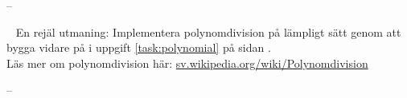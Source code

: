 


\SOLUTION


\TaskSolved \what --



\QUESTEND





\QUESTBEGIN

\Task  \what~ En rejäl utmaning: Implementera polynomdivision på lämpligt sätt genom att bygga vidare på   i  uppgift \ref{task:polynomial} på sidan \pageref{task:polynomial}.  \\ Läs mer om polynomdivision här: \href{https://sv.wikipedia.org/wiki/Polynomdivision}{sv.wikipedia.org/wiki/Polynomdivision}

\SOLUTION


\TaskSolved \what --

\QUESTEND

